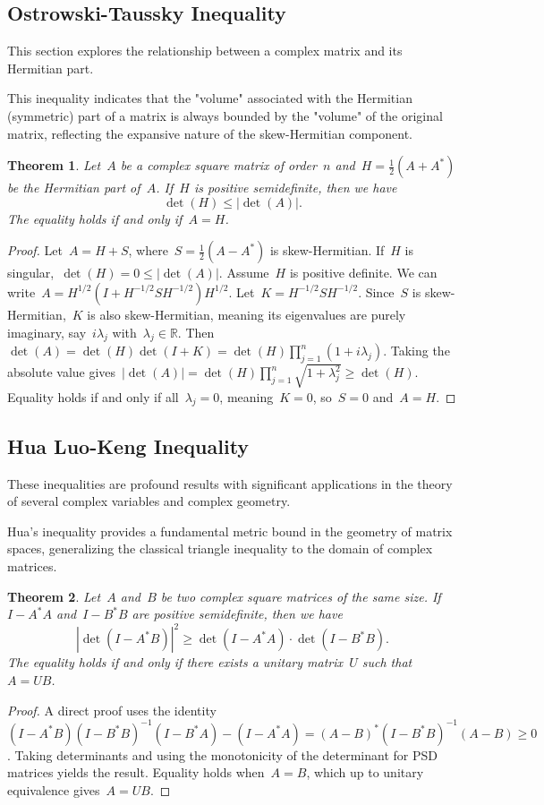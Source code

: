 \documentclass[12pt]{article}
\newtheorem{theorem}{Theorem}[section]
\begin{document}
\subsection{Ostrowski-Taussky Inequality}
This section explores the relationship between a complex matrix and its Hermitian part.

\noindent This inequality indicates that the "volume" associated with the Hermitian (symmetric) part of a matrix is always bounded by the "volume" of the original matrix, reflecting the expansive nature of the skew-Hermitian component.
\begin{theorem}
Let~$A$ be a complex square matrix of order~$n$ and~$H = \frac{1}{2}(A + A^*)$ be the Hermitian part of~$A$. If~$H$ is positive semidefinite, then we have
\[ \det(H) \le |\det(A)|. \]
The equality holds if and only if~$A = H$.
\end{theorem}
\begin{proof}
Let~$A = H + S$, where~$S = \frac{1}{2}(A - A^*)$ is skew-Hermitian. If~$H$ is singular,~$\det(H) = 0 \le |\det(A)|$. Assume~$H$ is positive definite. We can write~$A = H^{1/2}(I + H^{-1/2}SH^{-1/2})H^{1/2}$. Let~$K = H^{-1/2}SH^{-1/2}$. Since~$S$ is skew-Hermitian,~$K$ is also skew-Hermitian, meaning its eigenvalues are purely imaginary, say~$i\lambda_j$ with~$\lambda_j \in \mathbb{R}$. Then~$\det(A) = \det(H)\det(I+K) = \det(H) \prod_{j=1}^n (1+i\lambda_j)$. Taking the absolute value gives~$|\det(A)| = \det(H) \prod_{j=1}^n \sqrt{1+\lambda_j^2} \ge \det(H)$. Equality holds if and only if all~$\lambda_j = 0$, meaning~$K=0$, so~$S=0$ and~$A=H$.
\end{proof}

\subsection{Hua Luo-Keng Inequality}
These inequalities are profound results with significant applications in the theory of several complex variables and complex geometry.

\noindent Hua's inequality provides a fundamental metric bound in the geometry of matrix spaces, generalizing the classical triangle inequality to the domain of complex matrices.
\begin{theorem}
Let~$A$ and~$B$ be two complex square matrices of the same size. If~$I - A^*A$ and~$I - B^*B$ are positive semidefinite, then we have
\[ |\det(I - A^*B)|^2 \ge \det(I - A^*A) \cdot \det(I - B^*B). \]
The equality holds if and only if there exists a unitary matrix~$U$ such that~$A = UB$.
\end{theorem}
\begin{proof}
A direct proof uses the identity~$(I - A^*B)(I - B^*B)^{-1}(I - B^*A) - (I - A^*A) = (A-B)^*(I - B^*B)^{-1}(A-B) \ge 0$. Taking determinants and using the monotonicity of the determinant for PSD matrices yields the result. Equality holds when~$A=B$, which up to unitary equivalence gives~$A=UB$.
\end{proof}
\end{document}
